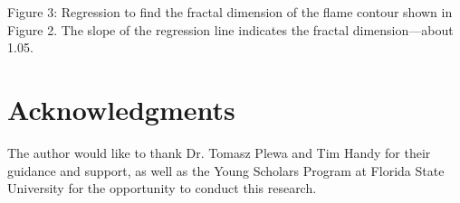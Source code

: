 \documentclass[iop]{emulateapj}
\begin{document}
	Figure 3: Regression to find the fractal dimension of the flame contour shown in Figure 2. The slope of the regression line indicates the fractal dimension—about 1.05.

\section{Acknowledgments}\label{s:ack}
The author would like to thank Dr. Tomasz Plewa and Tim Handy for their guidance and support, as well as the Young Scholars Program at Florida State University for the opportunity to conduct this research.
%
%


%
%
%
\end{document}

